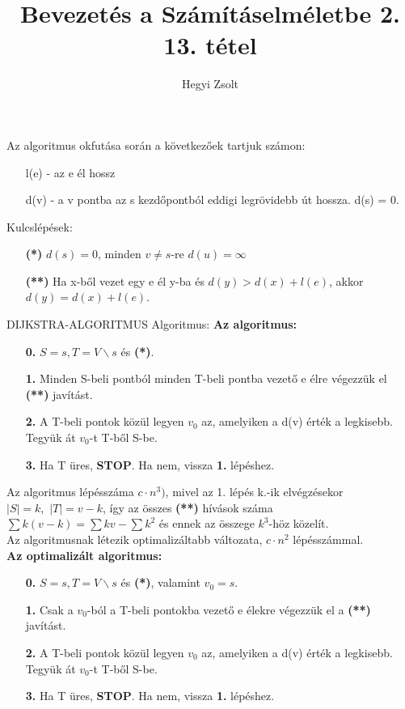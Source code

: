 \documentclass[]{article}
\title{Bevezetés a Számításelméletbe 2.\\{\large 13. tétel}}
\author{Hegyi Zsolt}
\begin{document}
\maketitle
\begin{framed}
Az algoritmus okfutása során a következőek tartjuk számon:
\begin{itemize}
\item[] l(e) - az e él hossz
\item[] d(v) - a v pontba az s kezdőpontból eddigi legrövidebb út hossza. d(s) = 0. 
\end{itemize}
Kulcslépések:
\begin{itemize}
\item[\textbf{(*)}]$d(s) = 0$, minden $v \neq s$-re $d(u) = \infty$ 
\item[\textbf{(**)}]Ha x-ből vezet egy e él y-ba és $d(y) > d(x) + l(e)$, akkor $d(y) = d(x) + l(e)$.
\end{itemize}
\end{framed}
\begin{framed}
DIJKSTRA-ALGORITMUS Algoritmus: 
\textbf{Az algoritmus:}
\begin{itemize}
\item[\textbf{0.}] $S = {s}, T = V\backslash {s}$ és \textbf{(*)}.
\item[\textbf{1.}] Minden S-beli pontból minden T-beli pontba vezető e élre végezzük el \textbf{(**)} javítást.
\item[\textbf{2.}] A T-beli pontok közül legyen $v_0$ az, amelyiken a d(v) érték a legkisebb. Tegyük át $v_0$-t T-ből S-be.
\item[\textbf{3.}] Ha T üres, \textbf{STOP}. Ha nem, vissza \textbf{1.} lépéshez.
\end{itemize}
Az algoritmus lépésszáma $c\cdot n^3)$, mivel az 1. lépés k.-ik elvégzésekor $|S| = k,\,\, |T| = v - k$, így az összes \textbf{(**)} hívások száma $\sum k(v-k) = \sum kv - \sum k^2$ és ennek az összege $k^3$-höz közelít.\\Az algoritmusnak létezik optimalizáltabb változata, $c\cdot n^2$ lépésszámmal.\\
\textbf{Az optimalizált algoritmus:}
\begin{itemize}
\item[\textbf{0.}] $S = {s}, T = V\backslash {s}$ és \textbf{(*)}, valamint $v_0 = s$.
\item[\textbf{1.}] Csak a $v_0$-ból a T-beli pontokba vezető e élekre végezzük el a \textbf{(**)} javítást.
\item[\textbf{2.}] A T-beli pontok közül legyen $v_0$ az, amelyiken a d(v) érték a legkisebb. Tegyük át $v_0$-t T-ből S-be.
\item[\textbf{3.}] Ha T üres, \textbf{STOP}. Ha nem, vissza \textbf{1.} lépéshez.
\end{itemize}
\end{framed}
\end{document}

